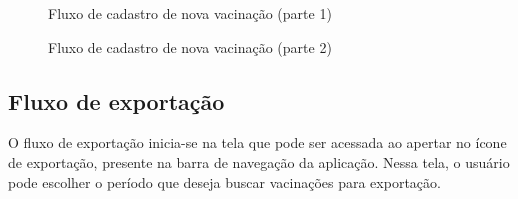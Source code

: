 \begin{figure}[ht!]
    \caption[Fluxo de cadastro de nova vacinação (parte 1)]{Fluxo de cadastro de nova vacinação (parte 1)}
  
  \label{fig:new_vaccination_flux_1}
\end{figure}

\begin{figure}[ht!]
  \centering
            \qquad
    \caption[Fluxo de cadastro de nova vacinação (parte 2)]{Fluxo de cadastro de nova vacinação (parte 2)}
  
  \label{fig:new_vaccination_flux_2}
\end{figure}

\subsection{Fluxo de exportação}
\label{cap5:SubSec:FluxoExportacao}
O fluxo de exportação inicia-se na tela que pode ser acessada ao apertar no ícone de exportação, presente na barra de navegação da aplicação. Nessa tela, o usuário pode escolher o período que deseja buscar vacinações para exportação.

